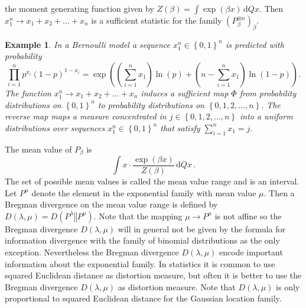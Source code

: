 \documentclass[10pt,a4paper,draft]{article}
\newtheorem{Example}{Example}
\begin{document}
the moment generating function given by
$Z\left(\beta\right)=\int\exp\left(\beta
x\right)\,\mathrm{d}Qx$.
Then $x_{1}^{n}\to x_{1}+x_{2}+\dots+x_{n}$ is a sufficient
statistic for the family $\left(P_{\beta}^{\otimes n}\right)_{\beta}.$ 
\begin{Example}
In a Bernoulli model a sequence $x_{1}^{n}\in\left\{ 0,1\right\}
^{n}$ is predicted with probability 
\[
\prod_{i=1}^{n}p^{x_{i}}\left(1-p\right)^{1-x_{i}}=\exp\left(\left(\sum_{i=1}^{n}x_{1}\right)\ln\left(p\right)+\left(n-\sum_{i=1}^{n}x_{1}\right)\ln\left(1-p\right)\right).
\]
The function $x_{1}^{n}\to x_{1}+x_{2}+\dots+x_{n}$ induces a
sufficient map $\Phi$ from probability distributions on $\left\{
0,1\right\} ^{n}$
to probability distributions on $\left\{ 0,1,2,\dots,n\right\}
.$
The reverse map maps a measure concentrated in
$j\in\left\{ 0,1,2,\dots,n\right\} $
into a uniform distributions over sequences $x_{1}^{n}\in\left\{
0,1\right\} ^{n}$
that satisfy $\sum_{i=1}^{n}x_{1}=j.$
\end{Example}
The mean value of $P_{\beta}$ is 
\[
\int x\cdot\frac{\exp\left(\beta
x\right)}{Z\left(\beta\right)}\,\mathrm{d}Qx\,.
\]
The set of possible mean values is called the mean value range
and is an interval. Let $P^{\mu}$ denote the element in the
exponential family with mean value $\mu.$ Then a Bregman divergence on the
mean value range is defined by
$D\left(\lambda,\mu\right)=D\left(P^{\lambda}\left\Vert
P^{\mu}\right.\right).$
Note that the mapping $\mu\to P^{\mu}$ is not affine so the
Bregman divergence $D\left(\lambda,\mu\right)$ will in general not be
given by the formula for information divergence with the family of
binomial distributions as the only exception. Nevertheless the Bregman
divergence
$D\left(\lambda,\mu\right)$ encode important information about
the exponential family. In statistics it is common to use squared
Euclidean distance as distortion measure, but often it is better to use
the Bregman divergence $D\left(\lambda,\mu\right)$ as distortion
measure. Note that $D\left(\lambda,\mu\right)$ is only proportional to
squared Euclidean distance for the Gaussian location family.
\end{document}
